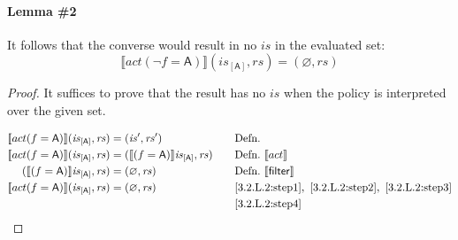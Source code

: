 \documentclass[12pt, letterpaper]{article}
\let\emptyset\varnothing
\newcommand\interp[1]{\llbracket #1 \rrbracket}
\begin{document}
 \paragraph{Lemma \#2}
     It follows that the converse would result in no $\mathit{is}$ in the evaluated set:
 \[
     \interp{ act(\neg f=\mathsf{A}) } (\mathit{is}_{[\mathsf{A}]}, \mathit{rs}) = (\emptyset, \mathit{rs})
 \]
 \begin{proof}
     It suffices to prove that the result has no $\mathit{is}$ when the policy is interpreted over the given set.
     \par\nobreak
     {\fontsize{10pt}{12pt}\selectfont
     \begin{alignat}{2}
         \setcounter{equation}{0}
         \label{3.2.L.2:step1}
         \interp{ act(f=\mathsf{A}) } (\mathit{is}_{[\mathsf{A}]}, \mathit{rs})
         &= 
         (\mathit{is}', \mathit{rs}')
         &&\quad \text{Defn.}
         \\
         \label{3.2.L.2:step2}
         \interp{ act(f=\mathsf{A}) } (\mathit{is}_{[\mathsf{A}]}, \mathit{rs})
         &= 
         (\interp{ (f=\mathsf{A}) } \mathit{is}_{[\mathsf{A}]}, \mathit{rs})
         &&\quad \text{Defn.}\ \interp{act}\\
         \label{3.2.L.2:step3}
         (\interp{ (f=\mathsf{A}) } \mathit{is}_{[\mathsf{A}]}, \mathit{rs})
         &=
         (\emptyset, \mathit{rs})
         &&\quad \text{Defn.}\ \interp{\mathsf{filter}}\\
         \label{3.2.L.2:step4}
         \interp{ act(f=\mathsf{A}) } (\mathit{is}_{[\mathsf{A}]}, \mathit{rs})
         &=
         (\emptyset, \mathit{rs})
         &&\quad \ref{3.2.L.2:step1},\ \ref{3.2.L.2:step2},\ \ref{3.2.L.2:step3}\\
         \label{3.2.L.2:QED}
         &\qedhere
         &&\quad \ref{3.2.L.2:step4}
     \end{alignat}
     }%
 \end{proof}
\end{document}
